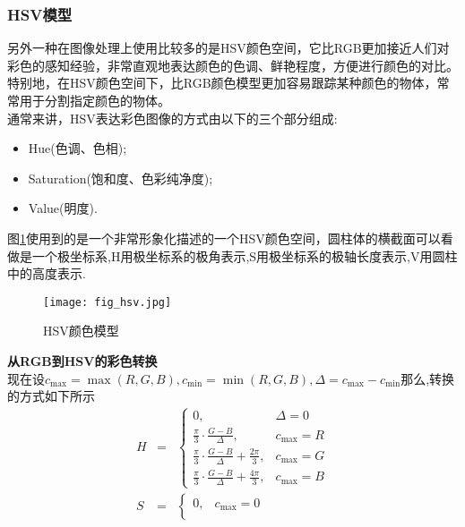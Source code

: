 \documentclass[UTF8,a4paper,10pt]{ctexart}
\begin{document}
\begin{flushleft}
        \subsubsection{HSV模型}
        \hspace{2em}另外一种在图像处理上使用比较多的是HSV颜色空间，它比RGB更加接近人们对彩色的感知经验，非常直观地表达颜色的色调、鲜艳程度，方便进行颜色的对比。特别地，在HSV颜色空间下，比RGB颜色模型更加容易跟踪某种颜色的物体，常常用于分割指定颜色的物体。\\
        \hspace{2em}通常来讲，HSV表达彩色图像的方式由以下的三个部分组成:
        \begin{itemize}
            \item Hue(色调、色相);
            \item Saturation(饱和度、色彩纯净度);
            \item Value(明度).
        \end{itemize}
        \hspace{2em}图\ref{fig:fig_hsv}使用到的是一个非常形象化描述的一个HSV颜色空间，圆柱体的横截面可以看做是一个极坐标系,H用极坐标系的极角表示,S用极坐标系的极轴长度表示,V用圆柱中的高度表示.\\
        \begin{figure}[hbpt]
            \centering
            \texttt{[image: fig\_hsv.jpg]}
            \caption{HSV颜色模型}
            \label{fig:fig_hsv}
        \end{figure}
        \heiti\textbf{从RGB到HSV的彩色转换}\songti\\
        \hspace{2em}现在设$c_{\max}=\max(R,G,B),c_{\min}=\min(R,G,B),\Delta=c_{\max}-c_{\min}$那么,转换的方式如下所示\\
        \begin{eqnarray}
            H&=&\begin{cases}
                0,&\Delta=0\\
                \frac{\pi}{3}\cdot\frac{G-B}{\Delta},&c_{\max}=R\\
                \frac{\pi}{3}\cdot\frac{G-B}{\Delta}+\frac{2\pi}{3},&c_{\max}=G\\
                \frac{\pi}{3}\cdot\frac{G-B}{\Delta}+\frac{4\pi}{3},&c_{\max}=B 
            \end{cases}\nonumber\\
            S&=&\begin{cases}
                0,&c_{\max}=0\\

\end{cases}
\end{eqnarray}
\end{flushleft}
\end{document}
